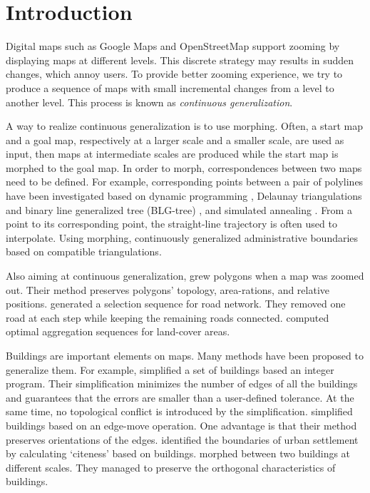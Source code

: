 \section{Introduction}
\label{sec:Introduction}


Digital maps such as Google Maps and OpenStreetMap 
support zooming by displaying maps at different levels. 
This discrete strategy may results in sudden changes, which annoy users.
To provide better zooming experience, 
we try to produce a sequence of maps 
with small incremental changes from a level to another level.
This process is known as \emph{continuous generalization}.

A way to realize continuous generalization is to use morphing.
Often, a start map and a goal map, 
respectively at a larger scale and a smaller scale, 
are used as input, 
then maps at intermediate scales are produced 
while the start map is morphed to the goal map.
In order to morph, correspondences between two maps need to be defined.
For example, corresponding points between a pair of polylines have been 
investigated based on 
dynamic programming \citep{mnwb-mpstc-08}, 
Delaunay triangulations and binary line generalized tree (BLG-tree)  
\citep{Deng2015},
and simulated annealing \citep{Li2017_Annealing}.
From a point to its corresponding point,
the straight-line trajectory is often used to interpolate.
Using morphing, \citet{Peng2016_Admin} continuously generalized 
administrative boundaries based on compatible triangulations.

Also aiming at continuous generalization,
\citet{Danciger2009} grew polygons when a map was zoomed out. Their method 
preserves polygons' topology, area-rations, and relative positions. 
\citet{Chimani2014_Eat} generated a selection sequence for road network.
They removed one road at each step while keeping the remaining roads connected.
\citet{Peng2017_AStar} computed optimal aggregation sequences 
for land-cover areas.

Buildings are important elements on maps.
Many methods have been proposed to generalize them.
For example, \citet{haunertwolff2010} simplified a set of buildings 
based an integer program.
Their simplification minimizes the number of edges of all the buildings 
and guarantees that the errors are smaller than a user-defined tolerance.
At the same time, no topological conflict is introduced by the simplification.
\citet{Buchin2011_Simp} simplified buildings based on an edge-move operation.
One advantage is that their method preserves orientations of the edges.
\citet{Chaudhry2008} identified the boundaries of urban settlement by
calculating `citeness' based on buildings.
\citet{Li2017_Building} morphed between two buildings at different scales.
They managed to preserve the orthogonal characteristics of buildings.


